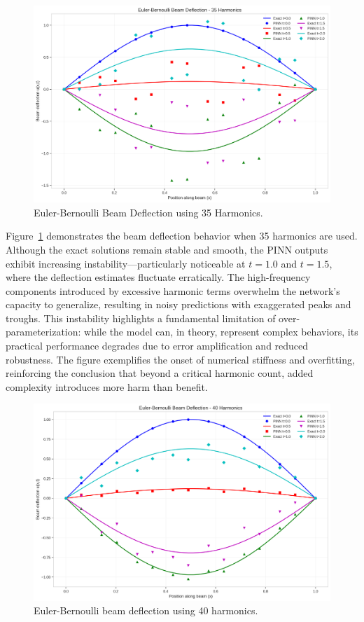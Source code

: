 \documentclass[preprint,12pt]{elsarticle}
\begin{document}
\begin{figure}[t]
    \centering
    \includegraphics[width=0.9\linewidth]{figures/euler_bernoulli_beam_35h.png}
    \caption{Euler-Bernoulli Beam Deflection using 35 Harmonics.}
    \label{fig:beam_deflection_35h}
\end{figure}

Figure~\ref{fig:beam_deflection_35h} demonstrates the beam deflection behavior when 35 harmonics are used. Although the exact solutions remain stable and smooth, the PINN outputs exhibit increasing instability—particularly noticeable at $t=1.0$ and $t=1.5$, where the deflection estimates fluctuate erratically. The high-frequency components introduced by excessive harmonic terms overwhelm the network’s capacity to generalize, resulting in noisy predictions with exaggerated peaks and troughs. This instability highlights a fundamental limitation of over-parameterization: while the model can, in theory, represent complex behaviors, its practical performance degrades due to error amplification and reduced robustness. The figure exemplifies the onset of numerical stiffness and overfitting, reinforcing the conclusion that beyond a critical harmonic count, added complexity introduces more harm than benefit.

\begin{figure}[t]
    \centering
    \includegraphics[width=0.9\linewidth]{figures/euler_bernoulli_beam_40h.png}
    \caption{Euler-Bernoulli beam deflection using 40 harmonics.}
    \label{fig:beam_40h}
\end{figure}
\end{document}
